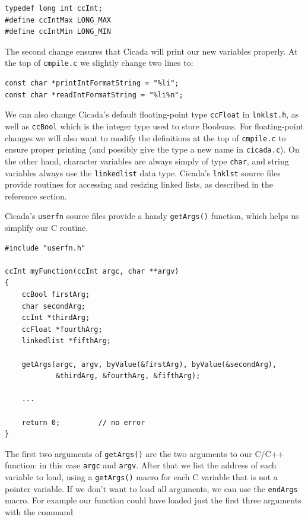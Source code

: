 \documentclass{article}
\newenvironment{code}{
       \begin{list}{}{
               \setlength{\leftmargin}{.4in}
               \setlength{\rightmargin}{0in}
               \setlength{\topsep}{.2in}
       }
       \small
       \item[] }
       { \end{list}   }
\begin{document}
\begin{code} \begin{verbatim}
typedef long int ccInt;
#define ccIntMax LONG_MAX
#define ccIntMin LONG_MIN
\end{verbatim} \end{code}

\noindent The second change ensures that Cicada will print our new variables properly.  At the top of \verb#cmpile.c# we slightly change two lines to:

\begin{code} \begin{verbatim}
const char *printIntFormatString = "%li";
const char *readIntFormatString = "%li%n";
\end{verbatim} \end{code}

We can also change Cicada's default floating-point type \verb#ccFloat# in \verb#lnklst.h#, as well as \verb#ccBool# which is the integer type used to store Booleans.  For floating-point changes we will also want to modify the definitions at the top of \verb#cmpile.c# to ensure proper printing (and possibly give the type a new name in \verb#cicada.c#).  On the other hand, character variables are always simply of type \verb#char#, and string variables always use the \verb#linkedlist# data type.  Cicada's \verb#lnklst# source files provide routines for accessing and resizing linked lists, as described in the reference section.

Cicada's \verb#userfn# source files provide a handy \verb#getArgs()# function, which helps us simplify our C routine.

\begin{code} \begin{verbatim}
#include "userfn.h"

ccInt myFunction(ccInt argc, char **argv)
{
    ccBool firstArg;
    char secondArg;
    ccInt *thirdArg;
    ccFloat *fourthArg;
    linkedlist *fifthArg;
    
    getArgs(argc, argv, byValue(&firstArg), byValue(&secondArg),
            &thirdArg, &fourthArg, &fifthArg);
    
    ...
    
    return 0;         // no error
}
\end{verbatim} \end{code}

\noindent The first two arguments of \verb#getArgs()# are the two arguments to our C/C++ function:  in this case \verb#argc# and \verb#argv#.  After that we list the address of each variable to load, using a \verb#getArgs()# macro for each C variable that is not a pointer variable.  If we don't want to load all arguments, we can use the \verb#endArgs# macro.  For example our function could have loaded just the first three arguments with the command
\end{document}

